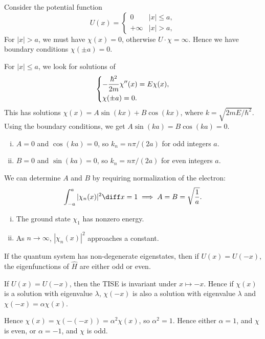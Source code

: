 \documentclass[12pt]{article}
\begin{document}
Consider the potential function
\[
	U(x) =
	\begin{cases}
		0 & |x| \leq a, \\
		+\infty & |x| > a,
	\end{cases}
\]
For $|x| > a$, we must have $\chi(x) = 0$, otherwise $U \cdot \chi = \infty$. Hence we have boundary conditions $\chi(\pm a) = 0$.

For $|x| \leq a$, we look for solutions of
\[
\begin{dcases}
	- \frac{\hbar^2}{2m} \chi''(x) = E \chi(x), \\
	\chi(\pm a) = 0.
\end{dcases}
\]
This has solutions $\chi(x) = A \sin (k x) + B \cos (k x)$, where $k = \sqrt{2mE/\hbar^2}$. Using the boundary conditions, we get $A \sin (k a) = B \cos (k a) = 0$.
\begin{enumerate}[(i)]
	\item $A = 0$ and $\cos (k a) = 0$, so $k_n = n \pi/(2a)$ for odd integers $a$.
	\item $B = 0$ and $\sin (k a) = 0$, so $k_n = n \pi/(2a)$ for even integers $a$.
\end{enumerate}

We can determine $A$ and $B$ by requiring normalization of the electron:
\[
	\int_{-a}^{a} |\chi_n(x)|^2\diff x = 1 \implies A = B = \sqrt{\frac{1}{a}}
.\]
\begin{remark}
	\begin{enumerate}[(i)]
		\item The ground state $\chi_1$ has nonzero energy.
		\item As $n \to \infty$, $|\chi_n(x)|^2$ approaches a constant.
	\end{enumerate}
\end{remark}

\begin{proposition}
	If the quantum system has non-degenerate eigenstates, then if $U(x) = U(-x)$, the eigenfunctions of $\hat H$ are either odd or even.
\end{proposition}

\begin{proofbox}	
If $U(x) = U(-x)$, then the TISE is invariant under $x \mapsto -x$. Hence if $\chi(x)$ is a solution with eigenvalue $\lambda$, $\chi(-x)$ is also a solution with eigenvalue $\lambda$ and $\chi(-x) = \alpha \chi(x)$.

	Hence $\chi(x) = \chi(-(-x)) = \alpha^2 \chi(x)$, so $\alpha^2 = 1$. Hence either $\alpha = 1$, and $\chi$ is even, or $\alpha = -1$, and $\chi$ is odd.
\end{proofbox}
\end{document}
